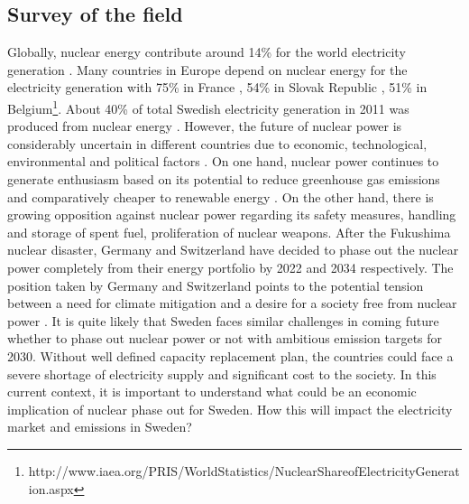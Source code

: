 \documentclass[10pt,a4paper]{article}
\begin{document}
\begin{comment}
Question 3:
Cost of disposal of nuclear waste
I oktober 2011 föreslog SSM en höjning av den avgift kärnkraftsindustrin betalar till Kärnavfallsfonden från cirka 1 öre/kWh producerad kärnkraftsel till cirka 3 öre/kWh. Den 22 december 2011 beslutade regeringen att endast höja avgiften till 2,2 öre/kWh. Under 2013 meddelade Kärnavfallsfonden att det ändå saknas över 30 miljarder kronor för att de avsatta pengarna ska räcka till slutförvaret av det svenska kärnavfallet. Enligt en uträkning som Sveriges Radio Vetenskapsradion låtit göra skulle avgiften behöva femfaldigas till runt 10 öre/kWh för att täcka upp underskottet i Kärnavfallsfonden.
\end{comment}


\subsection{Survey of the field}
Globally, nuclear energy contribute around 14\% for the world electricity generation \citep{OECD2012}. Many countries in Europe depend on nuclear energy for the electricity generation with 75\% in France , 54\% in Slovak Republic , 51\% in Belgium\footnote{http://www.iaea.org/PRIS/WorldStatistics/NuclearShareofElectricityGeneration.aspx}. About 40\% of total Swedish electricity generation in 2011 was produced from nuclear energy \citep{SEA2012}. However, the future of nuclear power is considerably uncertain in different countries due to economic, technological, environmental and political factors \citep{Joskow2012}. On one hand, nuclear power continues to generate enthusiasm based on its potential to reduce greenhouse gas emissions and comparatively cheaper to renewable energy \citep{Davis2012, Renssen2013}. On the other hand, there is growing opposition against nuclear power regarding its safety measures, handling and storage of spent fuel, proliferation of nuclear weapons. After the Fukushima nuclear disaster, Germany and Switzerland have decided to phase out the nuclear power completely from their energy portfolio by  2022 and 2034 respectively. The position taken by Germany and Switzerland points to the potential tension between a need for climate mitigation and a desire for a society free from nuclear power \citep{Glomsrod2013}. It is quite likely that Sweden faces similar challenges in coming future whether to phase out nuclear power or not with ambitious emission targets for 2030. Without well defined capacity replacement plan, the countries could face a severe shortage of electricity supply and significant cost to the society. In this current context, it is important to understand what could be an economic implication of nuclear phase out for Sweden. How this will impact the electricity market and emissions in Sweden?
\end{document}
